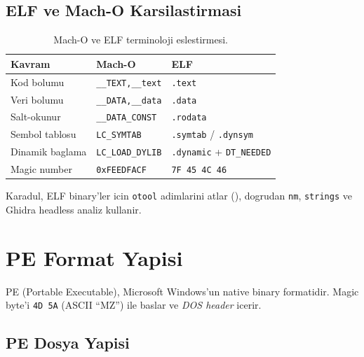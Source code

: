 \subsection{ELF ve Mach-O Karsilastirmasi}

\begin{table}[htbp]
\centering
\begin{tabular}{lll}
\toprule
\textbf{\color{sectioncyan}Kavram} & \textbf{\color{sectioncyan}Mach-O} & \textbf{\color{sectioncyan}ELF} \\
\midrule
Kod bolumu    & \texttt{\_\_TEXT,\_\_text} & \texttt{.text} \\
Veri bolumu   & \texttt{\_\_DATA,\_\_data} & \texttt{.data} \\
Salt-okunur   & \texttt{\_\_DATA\_CONST}   & \texttt{.rodata} \\
Sembol tablosu & \texttt{LC\_SYMTAB}       & \texttt{.symtab} / \texttt{.dynsym} \\
Dinamik baglama & \texttt{LC\_LOAD\_DYLIB} & \texttt{.dynamic} + \texttt{DT\_NEEDED} \\
Magic number  & \texttt{0xFEEDFACF}        & \texttt{7F 45 4C 46} \\
\bottomrule
\end{tabular}
\caption{Mach-O ve ELF terminoloji eslestirmesi.}
\label{tab:macho-elf-compare}
\end{table}

Karadul, ELF binary'ler icin \texttt{otool} adimlarini atlar (), dogrudan \texttt{nm}, \texttt{strings} ve Ghidra headless analiz kullanir.


\section{PE Format Yapisi}
\label{sec:pe-format}

PE (Portable Executable), Microsoft Windows'un native binary formatidir. Magic byte'i \texttt{4D 5A} (ASCII ``MZ'') ile baslar ve \emph{DOS header} icerir.

\subsection{PE Dosya Yapisi}

